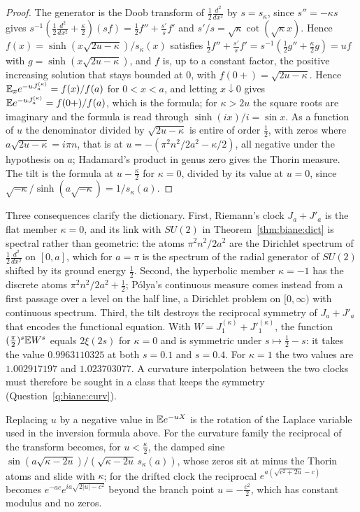 \begin{proof}
The generator is the Doob transform of $\frac12\frac{d^2}{dx^2}$ by $s=s_\kappa$, since $s''=-\kappa s$ gives $s^{-1}(\frac12\frac{d^2}{dx^2}+\frac\kappa2)(sf)=\frac12f''+\frac{s'}sf'$ and $s'/s=\sqrt\kappa\cot(\sqrt\kappa x)$. Hence $f(x)=\sinh(x\sqrt{2u-\kappa})/s_\kappa(x)$ satisfies $\frac12f''+\frac{s'}sf'=s^{-1}(\frac12g''+\frac\kappa2g)=uf$ with $g=\sinh(x\sqrt{2u-\kappa})$, and $f$ is, up to a constant factor, the positive increasing solution that stays bounded at $0$, with $f(0+)=\sqrt{2u-\kappa}$. Hence $\mathbb{E}_xe^{-uJ^{(\kappa)}_a}=f(x)/f(a)$ for $0<x<a$, and letting $x\downarrow0$ gives $\mathbb{E} e^{-uJ^{(\kappa)}_a}=f(0+)/f(a)$, which is the formula; for $\kappa>2u$ the square roots are imaginary and the formula is read through $\sinh(ix)/i=\sin x$. As a function of $u$ the denominator divided by $\sqrt{2u-\kappa}$ is entire of order $\frac12$, with zeros where $a\sqrt{2u-\kappa}=i\pi n$, that is at $u=-(\pi^2n^2/2a^2-\kappa/2)$, all negative under the hypothesis on $a$; Hadamard's product in genus zero gives the Thorin measure. The tilt is the formula at $u-\frac\kappa2$ for $\kappa=0$, divided by its value at $u=0$, since $\sqrt{-\kappa}/\sinh(a\sqrt{-\kappa})=1/s_\kappa(a)$.
\end{proof}

Three consequences clarify the dictionary. First, Riemann's clock $J_a+J'_a$ is the flat member $\kappa=0$, and its link with $SU(2)$ in Theorem~\ref{thm:biane:dict} is spectral rather than geometric: the atoms $\pi^2n^2/2a^2$ are the Dirichlet spectrum of $\frac12\frac{d^2}{dx^2}$ on $[0,a]$, which for $a=\pi$ is the spectrum of the radial generator of $SU(2)$ shifted by its ground energy $\frac12$. Second, the hyperbolic member $\kappa=-1$ has the discrete atoms $\pi^2n^2/2a^2+\frac12$; P\'olya's continuous measure comes instead from a first passage over a level on the half line, a Dirichlet problem on $[0,\infty)$ with continuous spectrum. Third, the tilt destroys the reciprocal symmetry of $J_a+J'_a$ that encodes the functional equation. With $W=J^{(\kappa)}_1+J'^{(\kappa)}_1$, the function $(\frac\pi2)^s\mathbb{E} W^s$ equals $2\xi(2s)$ for $\kappa=0$ and is symmetric under $s\mapsto\frac12-s$: it takes the value $0.9963110325$ at both $s=0.1$ and $s=0.4$. For $\kappa=1$ the two values are $1.002917197$ and $1.023703077$. A curvature interpolation between the two clocks must therefore be sought in a class that keeps the symmetry (Question~\ref{q:biane:curv}).

Replacing $u$ by a negative value in $\mathbb{E} e^{-uX}$ is the rotation of the Laplace variable used in the inversion formula above. For the curvature family the reciprocal of the transform becomes, for $u<\frac\kappa2$, the damped sine $\sin(a\sqrt{\kappa-2u})/(\sqrt{\kappa-2u}\,s_\kappa(a))$, whose zeros sit at minus the Thorin atoms and slide with $\kappa$; for the drifted clock the reciprocal $e^{a(\sqrt{c^2+2u}-c)}$ becomes $e^{-ac}e^{ia\sqrt{2|u|-c^2}}$ beyond the branch point $u=-\frac{c^2}2$, which has constant modulus and no zeros.

